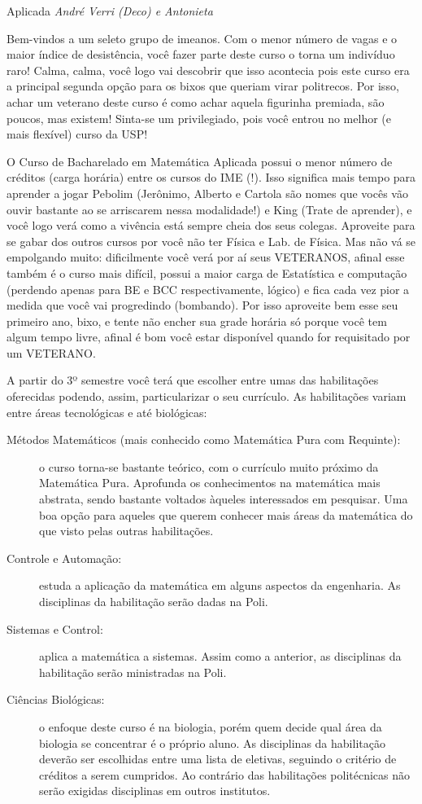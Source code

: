 \begin{subsecao}{Aplicada}
{\em André Verri (Deco) e Antonieta}

Bem-vindos a um seleto grupo de imeanos. Com o menor número de vagas e o
maior índice de desistência, você fazer parte deste curso o torna um indivíduo
raro! Calma, calma, você logo vai descobrir que isso acontecia pois este curso
era a principal segunda opção para os bixos que queriam virar politrecos. Por
isso, achar um veterano deste curso é como achar aquela figurinha premiada, são
poucos, mas existem! Sinta-se um privilegiado, pois você entrou no melhor (e
mais flexível) curso da USP!

O Curso de Bacharelado em Matemática Aplicada possui o menor número de
créditos (carga horária) entre os cursos do IME (!). Isso significa mais tempo
para aprender a jogar Pebolim (Jerônimo, Alberto e Cartola são nomes que vocês
vão ouvir bastante ao se arriscarem nessa modalidade!) e King (Trate de
aprender), e você logo verá como a vivência está sempre cheia dos seus colegas.
Aproveite para se gabar dos outros cursos por você não ter Física e Lab. de
Física. Mas não vá se empolgando muito: dificilmente você verá por aí seus
VETERANOS, afinal esse também é o curso mais difícil, possui a maior carga de
Estatística e computação (perdendo apenas para BE e BCC respectivamente,
lógico) e fica cada vez pior a medida que você vai progredindo (bombando). Por
isso aproveite bem esse seu primeiro ano, bixo, e tente não encher sua grade
horária só porque você tem algum tempo livre, afinal é bom você estar
disponível quando for requisitado por um VETERANO.

A partir do 3º semestre você terá que escolher entre umas das habilitações
oferecidas podendo, assim, particularizar o seu currículo. As habilitações
variam entre áreas tecnológicas e até biológicas:
\begin{description}

\item [Métodos Matemáticos (mais conhecido como Matemática Pura com Requinte):]
o curso torna-se bastante teórico, com o currículo muito próximo da Matemática
Pura. Aprofunda os conhecimentos na matemática mais abstrata, sendo bastante
voltados àqueles interessados em pesquisar. Uma boa opção para aqueles que
querem conhecer mais áreas da matemática do que visto pelas outras habilitações.
\item [Controle e Automação:] estuda a aplicação da matemática em alguns
aspectos da engenharia. As disciplinas da habilitação serão dadas na Poli.
\item  [Sistemas e Control:] aplica a matemática a sistemas. Assim como a
anterior, as disciplinas da habilitação serão ministradas na Poli.
\item  [Ciências Biológicas:] o enfoque deste curso é na biologia, porém quem
decide qual área da biologia se concentrar é o próprio aluno. As disciplinas da
habilitação deverão ser escolhidas entre uma lista de eletivas, seguindo o
critério de créditos a serem cumpridos. Ao contrário das habilitações
politécnicas não serão exigidas disciplinas em outros institutos.
\end{description}


\end{subsecao}
